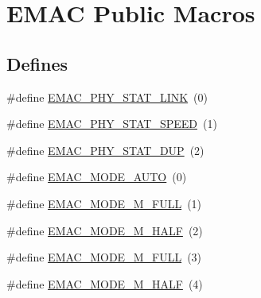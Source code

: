 \hypertarget{group___e_m_a_c___public___macros}{\section{\-E\-M\-A\-C \-Public \-Macros}
\label{group___e_m_a_c___public___macros}
}
\subsection*{\-Defines}
\begin{DoxyCompactItemize}
\item 
\#define \hyperlink{group___e_m_a_c___public___macros_gae0abe34513341da57ea1172fd3382bd5}{\-E\-M\-A\-C\-\_\-\-P\-H\-Y\-\_\-\-S\-T\-A\-T\-\_\-\-L\-I\-N\-K}~(0)
\item 
\#define \hyperlink{group___e_m_a_c___public___macros_gae28e7ef0be2f6c9d26b9e5ddc5966281}{\-E\-M\-A\-C\-\_\-\-P\-H\-Y\-\_\-\-S\-T\-A\-T\-\_\-\-S\-P\-E\-E\-D}~(1)
\item 
\#define \hyperlink{group___e_m_a_c___public___macros_gab11e8e4f1b2bded5e6fd1af33eff6296}{\-E\-M\-A\-C\-\_\-\-P\-H\-Y\-\_\-\-S\-T\-A\-T\-\_\-\-D\-U\-P}~(2)
\item 
\#define \hyperlink{group___e_m_a_c___public___macros_ga12c9de5c06859015df7f30eda601d046}{\-E\-M\-A\-C\-\_\-\-M\-O\-D\-E\-\_\-\-A\-U\-T\-O}~(0)
\item 
\#define \hyperlink{group___e_m_a_c___public___macros_ga20df377382f23ecca905dd8641e7b4d3}{\-E\-M\-A\-C\-\_\-\-M\-O\-D\-E\-\_\-M\-\_\-\-F\-U\-L\-L}~(1)
\item 
\#define \hyperlink{group___e_m_a_c___public___macros_gaf0e2ed1b1af2e4ce0f2edd1f8b716348}{\-E\-M\-A\-C\-\_\-\-M\-O\-D\-E\-\_\-M\-\_\-\-H\-A\-L\-F}~(2)
\item 
\#define \hyperlink{group___e_m_a_c___public___macros_ga2ff79609ffdae0a7e8499b77ef0d4097}{\-E\-M\-A\-C\-\_\-\-M\-O\-D\-E\-\_\-M\-\_\-\-F\-U\-L\-L}~(3)
\item 
\#define \hyperlink{group___e_m_a_c___public___macros_ga726fabbfd9feaa6c2e06d535d96665d1}{\-E\-M\-A\-C\-\_\-\-M\-O\-D\-E\-\_\-M\-\_\-\-H\-A\-L\-F}~(4)
\end{DoxyCompactItemize}


